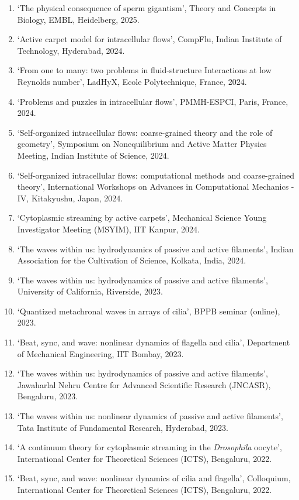 \documentclass[10pt]{res} %
\begin{document}
\begin{resume}
\begin{enumerate}
	\item `The physical consequence of sperm gigantism', Theory and Concepts in Biology, EMBL, Heidelberg, 2025.
	\item `Active carpet model for intracellular flows', CompFlu, Indian Institute of Technology, Hyderabad, 2024.
	\item `From one to many: two problems in fluid-structure Interactions at low Reynolds number', LadHyX, Ecole Polytechnique, France, 2024. 
	\item `Problems and puzzles in intracellular flows', PMMH-ESPCI, Paris, France, 2024.
	\item `Self-organized intracellular flows: coarse-grained theory and the role of geometry', Symposium on Nonequilibrium and Active Matter Physics Meeting, Indian Institute of Science, 2024.
	\item `Self-organized intracellular flows: computational methods and coarse-grained theory', International Workshops on Advances in Computational Mechanics - IV, Kitakyushu, Japan, 2024.
	\item `Cytoplasmic streaming by active carpets', Mechanical Science Young Investigator Meeting (MSYIM), IIT Kanpur, 2024.
	\item `The waves within us: hydrodynamics of passive and active filaments', Indian Association for the Cultivation of Science, Kolkata, India, 2024.
	\item `The waves within us: hydrodynamics of passive and active filaments', University of California, Riverside, 2023.
	\item `Quantized metachronal waves in arrays of cilia', BPPB seminar (online), 2023.
	\item `Beat, sync, and wave: nonlinear dynamics of flagella and cilia', Department of Mechanical Engineering, IIT Bombay, 2023.
	\item `The waves within us: hydrodynamics of passive and active filaments', Jawaharlal Nehru Centre for Advanced Scientific Research (JNCASR), Bengaluru, 2023.
	\item `The waves within us: nonlinear dynamics of passive and active filaments', Tata Institute of Fundamental Research, Hyderabad, 2023.
	\item `A continuum theory for cytoplasmic streaming in the \textit{Drosophila} oocyte', International Center for Theoretical Sciences (ICTS), Bengaluru, 2022. 
	\item `Beat, sync, and wave: nonlinear dynamics of cilia and flagella', Colloquium, International Center for Theoretical Sciences (ICTS), Bengaluru, 2022. 

\end{enumerate}
\end{resume}
\end{document}
